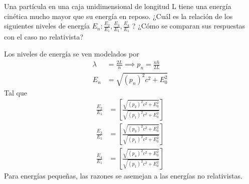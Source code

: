 \begin{problema}
    Una partícula en una caja unidimensional de longitud L tiene una energía cinética mucho mayor que su energía en reposo. ¿Cuál es la relación de los siguientes niveles de energía $E_{n}: \frac{E_{2}}{E_{1}}, \frac{E_{3}}{E_{1}}, \frac{E_{4}}{E_{1}}$ ? ¿Cómo se comparan sus respuestas con el caso no relativista?
    \begin{sol}
        Los niveles de energía se ven modelados por 
        \begin{align*}
            \lambda &= \frac{2L}{n}\implies
            p_n = \frac{nh}{2L}\\
            E_n &= \sqrt{\left(p_n\right)^2c^2+E_0^2}
        \end{align*}
        Tal que 
        \begin{align*}
            \frac{E_2}{E_1} &= \left[\frac{\sqrt{\left(p_2\right)^2c^2+E_0^2}}{\sqrt{\left(p_1\right)^2c^2+E_0^2}}\right]\\
            \frac{E_3}{E_1} &= \left[\frac{\sqrt{\left(p_3\right)^2c^2+E_0^2}}{\sqrt{\left(p_1\right)^2c^2+E_0^2}}\right]\\
            \frac{E_4}{E_1} &= \left[\frac{\sqrt{\left(p_4\right)^2c^2+E_0^2}}{\sqrt{\left(p_1\right)^2c^2+E_0^2}}\right]
        \end{align*}
        Para energías pequeñas, las razones se asemejan a las energías no relativistas. 
    \end{sol}
\end{problema}






%
%

